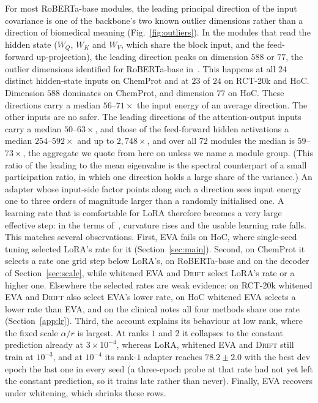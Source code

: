\documentclass[conference,onecolumn]{IEEEtran}
\newcommand{\method}{\textsc{Drift}}
\begin{document}
For most RoBERTa-base modules, the leading principal direction of the input
covariance is one of the backbone's two known outlier dimensions rather than a
direction of biomedical meaning (Fig.~\ref{fig:outliers}). In the modules that
read the hidden state ($W_Q$, $W_K$ and $W_V$, which share the block input, and
the feed-forward up-projection), the leading direction peaks on dimension $588$
or $77$, the outlier dimensions identified for RoBERTa-base
in~\cite{kovaleva2021bertbusters,puccetti2022outliers}. This happens at all $24$
distinct hidden-state inputs on ChemProt and at $23$ of $24$ on RCT-20k and HoC.
Dimension $588$ dominates on ChemProt, and dimension $77$ on HoC. These
directions carry a median $56$--$71\times$ the input energy of an average
direction. The other inputs are no safer. The leading directions of the
attention-output inputs carry a median $50$--$63\times$, and those of the
feed-forward hidden activations a median $254$--$592\times$ and up to
$2{,}748\times$, and over all $72$ modules the median is $59$--$73\times$, the
aggregate we quote from here on unless we name a module group. (This
ratio of the leading to the mean eigenvalue is the spectral counterpart of a
small participation ratio, in which one direction holds a large
share of the variance.) An adapter whose input-side factor points along such a
direction sees input energy one to three orders of magnitude larger than a
randomly initialised one. A learning rate that is comfortable for LoRA therefore
becomes a very large effective step: in the terms of~\cite{lee2026lrmatters},
curvature rises and the usable learning rate falls. This matches several
observations. First, EVA fails on HoC, where single-seed tuning selected LoRA's
rate for it (Section~\ref{sec:main}). Second, on ChemProt it selects a rate one
grid step below LoRA's, on RoBERTa-base and on the decoder of
Section~\ref{sec:scale}, while whitened EVA and \method{} select LoRA's rate or a
higher one. Elsewhere the selected rates are weak evidence: on RCT-20k whitened
EVA and \method{} also select EVA's lower rate, on HoC whitened EVA selects a
lower rate than EVA, and on the clinical notes all four methods share one rate
(Section~\ref{app:lr}). Third, the account
explains its behaviour at low rank, where the fixed scale $\alpha/r$ is largest.
At ranks $1$ and $2$ it collapses to the constant prediction already at
$3\times10^{-4}$, whereas LoRA, whitened EVA and \method{} still train at
$10^{-3}$, and at $10^{-4}$ its rank-$1$ adapter reaches $78.2\pm2.0$ with the
best dev epoch the last one in every seed (a three-epoch probe at that rate had
not yet left the constant prediction, so it trains late rather than never).
Finally, EVA recovers under whitening, which shrinks these rows.
\end{document}
